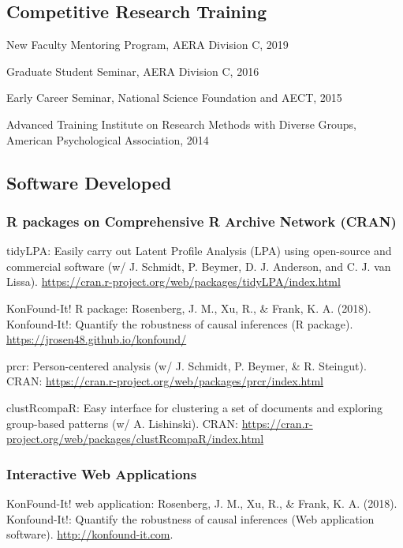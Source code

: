 \documentclass[]{article}
\begin{document}
\subsection{Competitive Research
Training}\label{competitive-research-training}

New Faculty Mentoring Program, AERA Division C, 2019

Graduate Student Seminar, AERA Division C, 2016

Early Career Seminar, National Science Foundation and AECT, 2015

Advanced Training Institute on Research Methods with Diverse Groups,
American Psychological Association, 2014

\subsection{Software Developed}\label{software-developed}

\subsubsection{R packages on Comprehensive R Archive Network
(CRAN)}\label{r-packages-on-comprehensive-r-archive-network-cran}

tidyLPA: Easily carry out Latent Profile Analysis (LPA) using
open-source and commercial software (w/ J. Schmidt, P. Beymer, D. J.
Anderson, and C. J. van Lissa).
\url{https://cran.r-project.org/web/packages/tidyLPA/index.html}

KonFound-It! R package: Rosenberg, J. M., Xu, R., \& Frank, K. A.
(2018). Konfound-It!: Quantify the robustness of causal inferences (R
package). \url{https://jrosen48.github.io/konfound/}

prcr: Person-centered analysis (w/ J. Schmidt, P. Beymer, \& R.
Steingut). CRAN:
\url{https://cran.r-project.org/web/packages/prcr/index.html}

clustRcompaR: Easy interface for clustering a set of documents and
exploring group-based patterns (w/ A. Lishinski). CRAN:
\url{https://cran.r-project.org/web/packages/clustRcompaR/index.html}

\subsubsection{Interactive Web
Applications}\label{interactive-web-applications}

KonFound-It! web application: Rosenberg, J. M., Xu, R., \& Frank, K. A.
(2018). Konfound-It!: Quantify the robustness of causal inferences (Web
application software). \url{http://konfound-it.com}.
\end{document}
